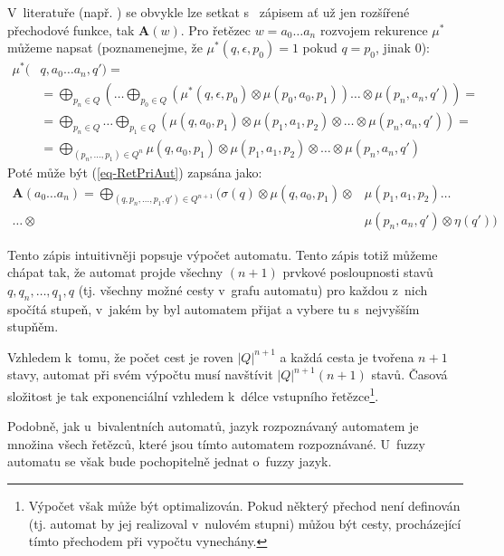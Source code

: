 \begin{note}
  V~literatuře (např. \cite{SebJoh-InvFuzzAutInvFuzzLang, IgnCirBog-DetFuzAutMemValComResLat, Bel-DetFuzAut}) se obvykle lze setkat s~ zápisem ať už jen rozšířené přechodové funkce, tak $\mathbf{A}(w)$. Pro řetězec $w = a_0 \dots a_n$ rozvojem rekurence $\mu^*$ můžeme napsat (poznamenejme, že $\mu^*(q, \epsilon, p_0) = 1$ pokud $q = p_0$, jinak $0$):
  \begin{align*}
   \mu^*(& q, a_0 \dots a_n, q') = \\
    &= \bigoplus_{p_n \in Q} \left( \dots \bigoplus_{p_0 \in Q} (\mu^*(q, \epsilon, p_0) \otimes \mu(p_0, a_0, p_1)) \dots \otimes \mu(p_n, a_n, q') \right) = \\
    &= \bigoplus_{p_n \in Q} \dots \bigoplus_{p_1 \in Q} \left( \mu(q, a_0, p_1) \otimes \mu(p_1, a_1, p_2) \otimes \dots \otimes \mu(p_n, a_n, q') \right) = \\
    &= \bigoplus_{(p_n,\dots, p_1) \in Q^n} \mu(q, a_0, p_1) \otimes \mu(p_1, a_1, p_2) \otimes \dots \otimes \mu(p_n, a_n, q')
  \end{align*}
  Poté může být (\ref{eq-RetPriAut}) zapsána jako:
  \begin{align*}
    \mathbf{A}(a_0 \dots a_n) 
    = \bigoplus_{(q, p_n,\dots, p_1, q') \in Q^{n+1}} (\sigma(q) \otimes \mu(q, a_0, p_1) \otimes &\mu(p_1, a_1, p_2) \dots \\
     \dots \otimes &\mu(p_n, a_n, q') \otimes \eta(q'))
  \end{align*}

  Tento zápis intuitivněji popsuje výpočet automatu. Tento zápis totiž můžeme chápat tak, že automat projde všechny $(n+1)$ prvkové posloupnosti stavů $q, q_n, \dots, q_1, q$ (tj. všechny možné cesty v~grafu automatu) pro každou z~nich spočítá stupeň, v~jakém by byl automatem přijat a vybere tu s~nejvyšším stupňěm.
  
  Vzhledem k~tomu, že počet cest je roven $|Q|^{n+1}$ a každá cesta je tvořena $n+1$ stavy, automat při svém výpočtu musí navštívit $|Q|^{n+1}(n+1)$ stavů. Časová složitost je tak exponenciální vzhledem k~délce vstupního řetězce\footnote{Výpočet však může být optimalizován. Pokud některý přechod není definován (tj. automat by jej realizoval v~nulovém stupni) můžou být cesty, procházející tímto přechodem při vypočtu vynechány.}.
\end{note}

Podobně, jak u~bivalentních automatů, jazyk rozpoznávaný automatem je množina všech řetězců, které jsou tímto automatem rozpoznávané. U~fuzzy automatu se však bude pochopitelně jednat o~fuzzy jazyk.

